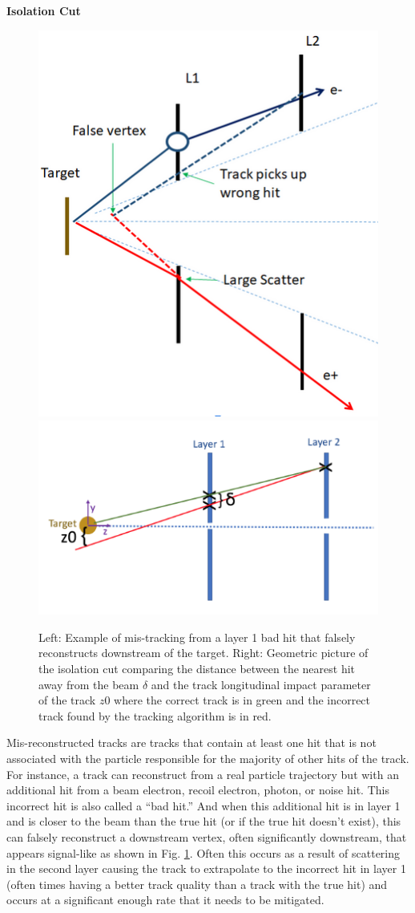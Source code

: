 \clearpage

\textbf{Isolation Cut}

\begin{figure}[t]
    \centering
    \includegraphics[width=.35\textwidth]{figs/selection/isocut_schem.png}
    \includegraphics[width=.45\textwidth]{figs/selection/isocut.png}
    \caption{Left: Example of mis-tracking from a layer 1 bad hit that falsely reconstructs downstream of the target. Right: Geometric picture of the isolation cut comparing the distance between the nearest hit away from the beam $\delta$ and the track longitudinal impact parameter of the track $z0$ where the correct track is in green and the incorrect track found by the tracking algorithm is in red.
    }
    \label{fig:iso_cut}
\end{figure}


Mis-reconstructed tracks are tracks that contain at least one hit that is not associated with the particle responsible for the majority of other hits of the track. For instance, a track can reconstruct from a real particle trajectory but with an additional hit from a beam electron, recoil electron, photon, or noise hit. This incorrect hit is also called a ``bad hit.'' And when this additional hit is in layer 1 and is closer to the beam than the true hit (or if the true hit doesn't exist), this can falsely reconstruct a downstream vertex, often significantly downstream, that appears signal-like as shown in Fig. \ref{fig:iso_cut}. Often this occurs as a result of scattering in the second layer causing the track to extrapolate to the incorrect hit in layer 1 (often times having a better track quality than a track with the true hit) and occurs at a significant enough rate that it needs to be mitigated.

